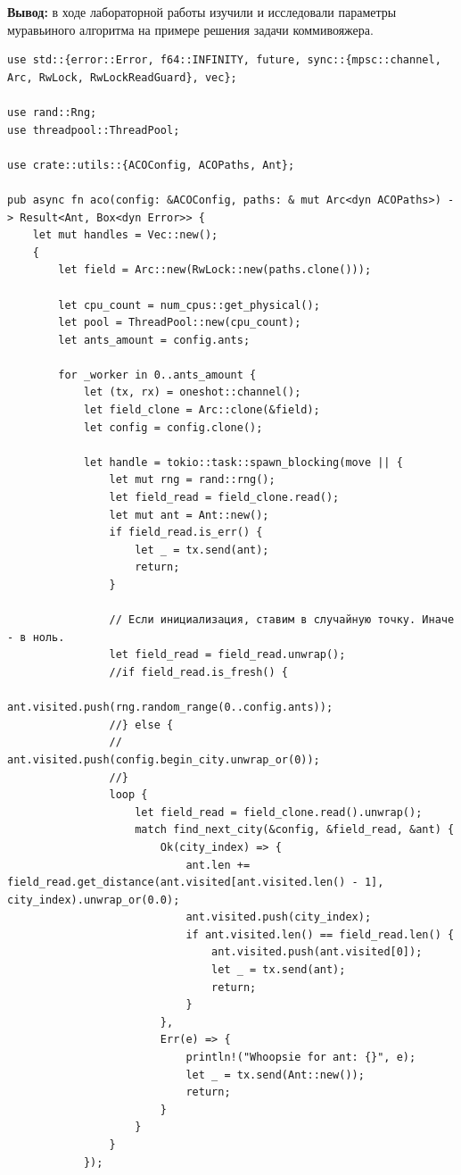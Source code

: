 \documentclass[a4paper,14pt]{extarticle}
\begin{document}
\textbf{Вывод: } в ходе лабораторной работы изучили и исследовали параметры муравьиного
алгоритма на примере решения задачи коммивояжера.

\begin{verbatim}
use std::{error::Error, f64::INFINITY, future, sync::{mpsc::channel, Arc, RwLock, RwLockReadGuard}, vec};

use rand::Rng;
use threadpool::ThreadPool;

use crate::utils::{ACOConfig, ACOPaths, Ant};

pub async fn aco(config: &ACOConfig, paths: & mut Arc<dyn ACOPaths>) -> Result<Ant, Box<dyn Error>> {
    let mut handles = Vec::new();
    {
        let field = Arc::new(RwLock::new(paths.clone()));
        
        let cpu_count = num_cpus::get_physical();
        let pool = ThreadPool::new(cpu_count);
        let ants_amount = config.ants;
        
        for _worker in 0..ants_amount {
            let (tx, rx) = oneshot::channel();
            let field_clone = Arc::clone(&field);
            let config = config.clone();

            let handle = tokio::task::spawn_blocking(move || {
                let mut rng = rand::rng();
                let field_read = field_clone.read();
                let mut ant = Ant::new();
                if field_read.is_err() {
                    let _ = tx.send(ant);
                    return;
                }

                // Если инициализация, ставим в случайную точку. Иначе - в ноль.
                let field_read = field_read.unwrap();
                //if field_read.is_fresh() {
                    ant.visited.push(rng.random_range(0..config.ants));
                //} else {
                //    ant.visited.push(config.begin_city.unwrap_or(0));
                //}
                loop {
                    let field_read = field_clone.read().unwrap();
                    match find_next_city(&config, &field_read, &ant) {
                        Ok(city_index) => {
                            ant.len += field_read.get_distance(ant.visited[ant.visited.len() - 1], city_index).unwrap_or(0.0);
                            ant.visited.push(city_index);
                            if ant.visited.len() == field_read.len() {
                                ant.visited.push(ant.visited[0]);
                                let _ = tx.send(ant);
                                return;
                            }
                        },
                        Err(e) => {
                            println!("Whoopsie for ant: {}", e);
                            let _ = tx.send(Ant::new());
                            return;
                        }
                    }
                }
            });


\end{verbatim}
\end{document}
